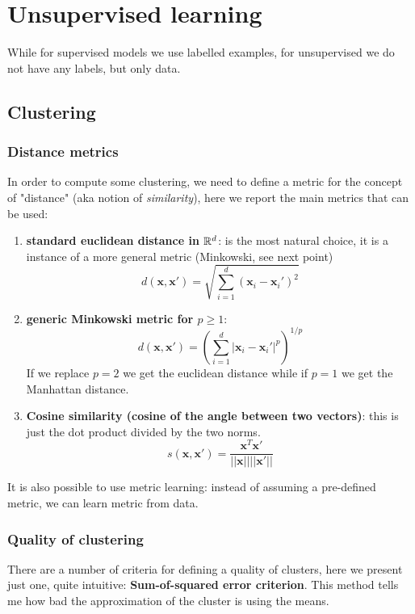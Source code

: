 \chapter{Unsupervised learning}
\label{cha:unsupervised}

While for supervised models we use labelled examples, for unsupervised we do not have any labels, but only data.

\section{Clustering}
    \subsection{Distance metrics}
        In order to compute some clustering, we need to define a metric for the concept of "distance" (aka notion of \textit{similarity}), here we report the main metrics that can be used:
        \begin{enumerate}
            \item \textbf{standard euclidean distance in $\mathbb{R}^d$}: is the most natural choice, it is a instance of a more general metric (Minkowski, see next point)
            $$d(\pmb{x}, \pmb{x}') = \sqrt{\sum _{i=1} ^ d (\pmb{x}_i - \pmb{x}_i ')^2}$$
            \item \textbf{generic Minkowski metric for $p \geq 1$}:
            $$d(\pmb{x}, \pmb{x}') = \left(\sum _{i=1} ^ d |\pmb{x}_i - \pmb{x}_i '|^p \right)^{1/p}$$ If we replace $p=2$ we get the euclidean distance while if $p=1$ we get the Manhattan distance.
            \item \textbf{Cosine similarity (cosine  of the angle between two vectors)}: this is just the dot product divided by the two norms.
            $$s(\pmb{x}, \pmb{x}') = \frac{\pmb{x}^T \pmb{x}'}{||\pmb{x}|| ||\pmb{x}'||}$$
      \end{enumerate}

      It is also possible to use metric learning: instead of assuming a pre-defined metric, we can learn metric from data.

    \subsection{Quality of clustering}
        There are a number of criteria for defining a quality of clusters, here we present just one, quite intuitive: \textbf{Sum-of-squared error criterion}. 
        This method tells me how bad the approximation of the cluster is using the means.\\

